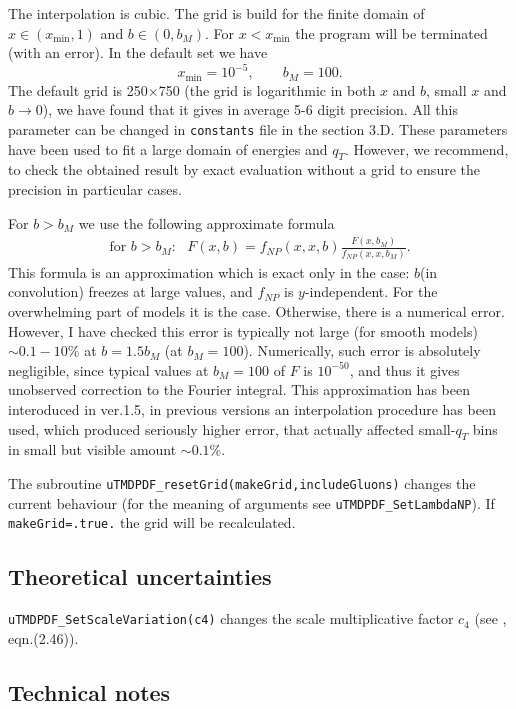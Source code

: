 \documentclass[prd,nofootinbib,eqsecnum,final]{revtex4}
\renewcommand{\(}{\left(}
\renewcommand{\)}{\right)}
\renewcommand{\[}{\left[}
\renewcommand{\]}{\right]}
\begin{document}
The interpolation is cubic. The grid is build for the finite domain of $x\in(x_{\min},1)$ and $b\in(0,b_M)$. For $x<x_{\min}$ the program will be terminated (with an error). In the default set we have
$$x_{\min}=10^{-5},\qquad b_M=100.$$
The default grid is 250$\times$750 (the grid is logarithmic in both $x$ and $b$, small $x$ and $b\to0$), we have found that it gives in average 5-6 digit precision. All this parameter can be changed in \texttt{constants} file in the section 3.D. These parameters have been used to fit a large domain of energies and $q_T$. However, we recommend, to check the obtained result by exact evaluation without a grid to ensure the precision in particular cases.


For $b>b_M$ we use the following approximate formula
\begin{eqnarray}
\text{for $b>b_M$}:~~~F(x,b)=f_{NP}(x,x,b)\frac{F(x,b_M)}{f_{NP}(x,x,b_M)}.
\end{eqnarray}
This formula is an approximation which is exact only in the case: $b$(in convolution) freezes at large values, and $f_{NP}$ is $y$-independent. For the overwhelming part of models it is the case. Otherwise, there is a numerical error. However, I have checked this error is typically not large (for smooth models) $\sim 0.1-10\%$ at $b=1.5 b_M$ (at $b_M=100$). Numerically, such error is absolutely negligible, since typical values at $b_M=100$ of $F$ is $10^{-50}$, and thus it gives unobserved correction to the Fourier integral. This approximation has been interoduced in ver.1.5, in previous versions an interpolation procedure has been used, which produced seriously higher error, that actually affected small-$q_T$ bins in small but visible amount $\sim 0.1\%$.

The subroutine \texttt{uTMDPDF\_resetGrid(makeGrid,includeGluons)} changes the current behaviour (for the meaning of arguments see  \texttt{uTMDPDF{\_}SetLambdaNP}). If \texttt{makeGrid=.true.} the grid will be recalculated.

\subsection{Theoretical uncertainties}

\texttt{uTMDPDF\_SetScaleVariation(c4)} changes the scale multiplicative factor $c_4$ (see \cite{Scimemi:2017etj}, eqn.(2.46)). 

\subsection{Technical notes}
\label{sec:technicalNote_1}
\end{document}
